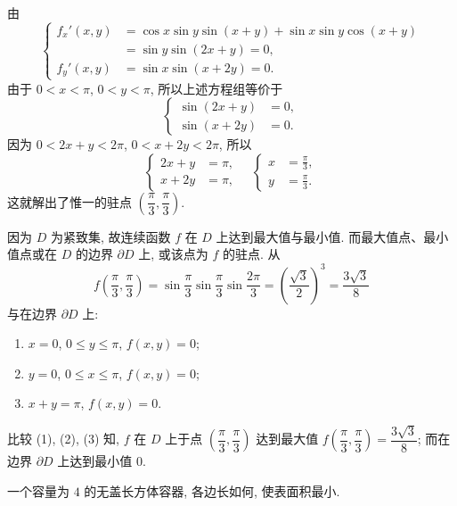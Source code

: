 \begin{solution}
由
\[
  \left\{\begin{aligned}
    f_{x}'(x, y) &= \cos x\sin y\sin(x + y) + \sin x\sin y\cos(x + y) \\
    &= \sin y\sin(2x + y) = 0, \\
    f_{y}'(x, y) &= \sin x\sin(x + 2y) = 0.
  \end{aligned}\right.
\]
由于 $0 < x < \pi$, $0 < y < \pi$, 所以上述方程组等价于
\[
  \left\{\begin{aligned}
    \sin(2x + y) &= 0, \\
    \sin(x + 2y) &= 0.
  \end{aligned}\right.
\]
因为 $0 < 2x + y < 2\pi$, $0 < x + 2y < 2\pi$, 所以
\[
  \left\{\begin{aligned}
    2x + y &= \pi, \\
    x + 2y &= \pi,
  \end{aligned}\right. \quad \left\{\begin{aligned}
    x &= \frac{\pi}{3}, \\
    y &= \frac{\pi}{3}.
  \end{aligned}\right.
\]
这就解出了惟一的驻点 $\left(\dfrac{\pi}{3}, \dfrac{\pi}{3}\right)$.

因为 $D$ 为紧致集, 故连续函数 $f$ 在 $D$ 上达到最大值与最小值. 而最大值点、最小值点或在 $D$ 的边界 $\partial D$ 上, 或该点为 $f$ 的驻点. 从
\[
  f\left(\frac{\pi}{3}, \frac{\pi}{3}\right) = \sin\frac{\pi}{3}\sin\frac{\pi}{3}\sin\frac{2\pi}{3} = \left(\frac{\sqrt{3}}{2}\right)^{3} = \frac{3\sqrt{3}}{8}
\]
与在边界 $\partial D$ 上:
\begin{enumerate}
  \item $x = 0$, $0 \leqslant y \leqslant \pi$, $f(x, y) = 0$;
  \item $y = 0$, $0 \leqslant x \leqslant \pi$, $f(x, y) = 0$;
  \item $x + y = \pi$, $f(x, y) = 0$.
\end{enumerate}
比较 (1), (2), (3) 知, $f$ 在 $D$ 上于点 $\left(\dfrac{\pi}{3}, \dfrac{\pi}{3}\right)$ 达到最大值 $f\left(\dfrac{\pi}{3}, \dfrac{\pi}{3}\right) = \dfrac{3\sqrt{3}}{8}$; 而在边界 $\partial D$ 上达到最小值 $0$.
\end{solution}

\begin{example}\label{ex:9.2.4}
一个容量为 $4$ 的无盖长方体容器, 各边长如何, 使表面积最小.
\end{example}

